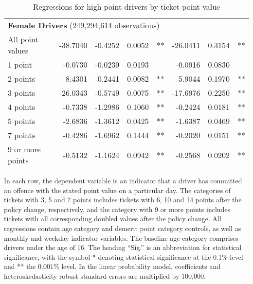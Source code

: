 \begin{table}
\begin{tabular}{l r r r l r r l}
\hline 

\multicolumn{7}{l}{\textbf{Female Drivers} (249,294,614 observations)} \\ 

All point values                &  -38.7040       &  -0.4252        &  0.0052       &   **       &  -26.0411        &  0.3154       &   **       \\ 
1 point                         &  -0.0730       &  -0.0239        &  0.0193       &            &  -0.0916        &  0.0830       &            \\ 
2 points                        &  -8.4301       &  -0.2441        &  0.0082       &   **       &  -5.9044        &  0.1970       &   **       \\ 
3 points                        &  -26.0343       &  -0.5749        &  0.0075       &   **       &  -17.6976        &  0.2250       &   **       \\ 
4 points                        &  -0.7338       &  -1.2986        &  0.1060       &   **       &  -0.2424        &  0.0181       &   **       \\ 
5 points                        &  -2.6836       &  -1.3612        &  0.0425       &   **       &  -1.6387        &  0.0469       &   **       \\ 
7 points                        &  -0.4286       &  -1.6962        &  0.1444       &   **       &  -0.2020        &  0.0151       &   **       \\ 
9 or more points                &  -0.5132       &  -1.1624        &  0.0942       &   **       &  -0.2568        &  0.0202       &   **       \\ 

\hline 

\end{tabular} 
\caption{Regressions for high-point drivers by ticket-point value} 
In each row, the dependent variable is an indicator that a driver has committed  
an offence with the stated point value on a particular day.  
The categories of tickets with 3, 5 and 7 points includes tickets  
with 6, 10 and 14 points after the policy change, respectively,  
and the category with 9 or more points includes tickets  
with all corresponding doubled values after the policy change. 
All regressions contain age category and demerit point category controls, 
as well as monthly and weekday indicator variables. 
The baseline age category comprises drivers under the age of 16. 
The heading ``Sig.'' is an abbreviation for statistical significance, with 
the symbol * denoting statistical significance at the 0.1\% level 
and ** the 0.001\% level. 
In the linear probability model, coefficients and heteroskedasticity-robust standard errors are  
multiplied by 100,000.  
\label{tab:seas_Logit_vs_LPMx100K_regs_by_points} 
\end{table} 
 
